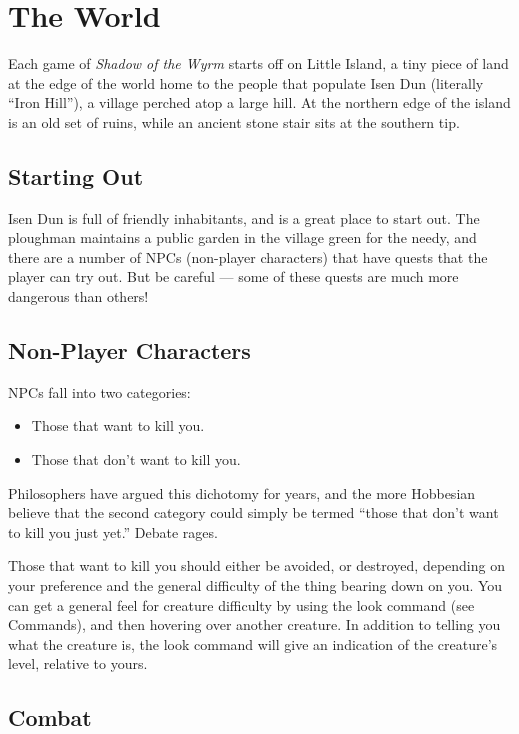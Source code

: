 \section{The World}

Each game of {\it Shadow of the Wyrm} starts off on Little Island, a tiny 
piece of land at the edge of the world home to the people that populate 
Isen Dun (literally ``Iron Hill''), a village perched atop a large hill.  
At the northern edge of the island is an old set of ruins, while an ancient
stone stair sits at the southern tip.

\subsection{Starting Out}

Isen Dun is full of friendly inhabitants, and is a great place to start
out.  The ploughman maintains a public garden in the village green for the
needy, and there are a number of NPCs (non-player characters) that have
quests that the player can try out.  But be careful --- some of these quests
are much more dangerous than others! 

\subsection{Non-Player Characters}

NPCs fall into two categories:

\begin{itemize}
\item Those that want to kill you.
\item Those that don't want to kill you.
\end{itemize}

Philosophers have argued this dichotomy for years, and the more Hobbesian
believe that the second category could simply be termed ``those that don't
want to kill you just yet.''  Debate rages.

Those that want to kill you should either be avoided, or destroyed,
depending on your preference and the general difficulty of the thing
bearing down on you.  You can get a general feel for creature difficulty
by using the look command (see Commands), and then hovering over another 
creature.  In addition to telling you what the creature is, the look 
command will give an indication of the creature's level, relative to yours.

\subsection{Combat}

